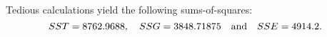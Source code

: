 \begin{solution}
Tedious calculations yield the following sums-of-squares:
\[
SST = 8762.9688,\quad SSG = 3848.71875 \text{\quad and\quad} SSE = 4914.2.
\]

%


\end{solution}
